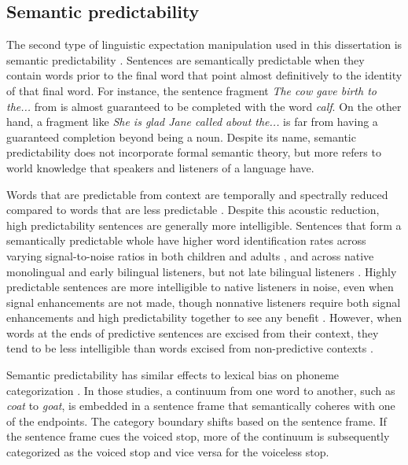 \subsection{Semantic predictability}
\label{sec:semanticpredictability}

The second type of linguistic expectation manipulation used in this dissertation is semantic predictability \citep{Kalikow1977}.
Sentences are semantically predictable when they contain words prior to the final word that point almost definitively to the identity of that final word.  
For instance, the sentence fragment \emph{The cow gave birth to the...} from \citet{Kalikow1977} is almost guaranteed to be completed with the word \emph{calf}.  
On the other hand, a fragment like \emph{She is glad Jane called about the...} is far from having a guaranteed completion beyond being a noun.
Despite its name, semantic predictability does not incorporate formal semantic theory, but more refers to world knowledge that speakers and listeners of a language have.

Words that are predictable from context are temporally and spectrally reduced compared to words that are less predictable \citep{Scarborough2010, Clopper2008}. 
Despite this acoustic reduction, high predictability sentences are generally more intelligible.
Sentences that form a semantically predictable whole have higher word identification rates across varying signal-to-noise ratios \citep{Kalikow1977} in both children and adults \citep{Fallon2002}, and across native monolingual and early bilingual listeners, but not late bilingual listeners \citep{Mayo1997}.
Highly predictable sentences are more intelligible to native listeners in noise, even when signal enhancements are not made, though nonnative listeners require both signal enhancements and high predictability together to see any benefit \citep{Bradlow2007}.
However, when words at the ends of predictive sentences are excised from their context, they tend to be less intelligible than words excised from non-predictive contexts \citep{Lieberman1963}.

Semantic predictability has similar effects to lexical bias on phoneme categorization \citep{Connine1987, Borsky1998}.  
In those studies, a continuum from one word to another, such as \emph{coat} to \emph{goat}, is embedded in a sentence frame that semantically coheres with one of the endpoints.  
The category boundary shifts based on the sentence frame.
If the sentence frame cues the voiced stop, more of the continuum is subsequently categorized as the voiced stop and vice versa for the voiceless stop.

